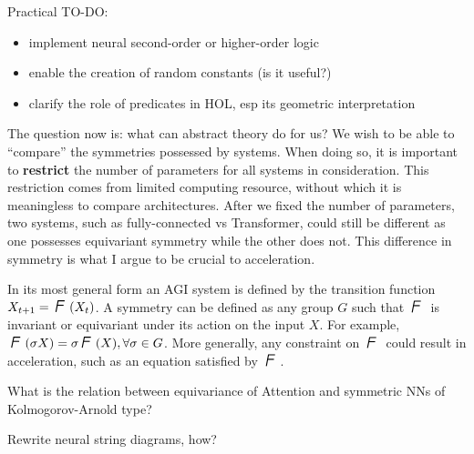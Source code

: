 Practical TO-DO:
\begin{itemize}
	\item implement neural second-order or higher-order logic
	\item enable the creation of random constants (is it useful?)
	\item clarify the role of predicates in HOL, esp its geometric interpretation
\end{itemize}


The question now is:  what can abstract theory do for us?  We wish to be able to ``compare'' the symmetries possessed by systems.  When doing so, it is important to \textbf{restrict} the number of parameters for all systems in consideration.  This restriction comes from limited computing resource, without which it is meaningless to compare architectures.  After we fixed the number of parameters, two systems, such as fully-connected vs Transformer, could still be different as one possesses equivariant symmetry while the other does not.  This difference in symmetry is what I argue to be crucial to acceleration.

In its most general form an AGI system is defined by the transition function $X_{t+1} = \squareF(X_t)$.  A symmetry can be defined as any group $G$ such that $\squareF$ is invariant or equivariant under its action on the input $X$.  For example, $\squareF(\sigma X) = \sigma \squareF(X), \forall \sigma \in G$.  More generally, any constraint on $\squareF$ could result in acceleration, such as an equation satisfied by $\squareF$.

What is the relation between equivariance of Attention and symmetric NNs of Kolmogorov-Arnold type?

Rewrite neural string diagrams, how?
